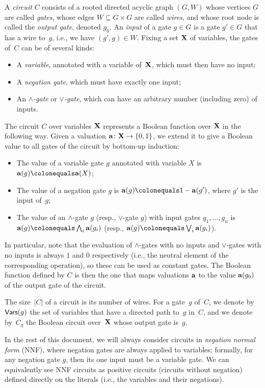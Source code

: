 A \emph{circuit} $C$ consists of a rooted directed acyclic graph $(G, W)$ whose vertices $G$ are called \emph{gates}, whose edges $W \subseteq G \times G$ are called \emph{wires}, and whose root node is called the \emph{output gate}, denoted $g_0$. 
An \emph{input} of a gate $g \in G$ is a gate $g' \in G$ that has a wire to~$g$, i.e., we have $(g', g) \in W$.
Fixing a set $\mathbf{X}$ of variables, the gates of~$C$ can be of several kinds:
\begin{itemize}
\item A \emph{variable}, annotated with a variable of~$\mathbf{X}$, which must then have no input;
\item A \emph{negation gate}, which must have exactly one input;
\item An \emph{$\land$-gate} or \emph{$\lor$-gate}, which can have an arbitrary number (including zero) of inputs.
\end{itemize}
The circuit $C$ over variables $\mathbf{X}$ represents a Boolean function over $\mathbf{X}$ in the following way.
Given a valuation $\mathbf{a}\colon \mathbf{X} \to \{0, 1\}$, we extend it to give a Boolean value to all gates of the circuit by bottom-up induction:
\begin{itemize}
    \item The value of a variable gate $g$ annotated with variable $X$ is $\ba(g) \colonequals \ba(X)$;
    \item The value of a negation gate $g$ is $\ba(g) \colonequals 1 - \ba(g')$, where $g'$ is the input of~$g$;
    \item The value of an $\land$-gate $g$ (resp., $\lor$-gate $g$) with input gates $g_1, \ldots, g_n$ is $\ba(g) \colonequals \bigwedge_i \ba(g_i)$ (resp., $\ba(g) \colonequals \bigvee_i \ba(g_i)$).
\end{itemize}
In particular, note that the evaluation of $\land$-gates with no inputs and $\lor$-gates with no inputs is always $1$ and $0$ respectively (i.e., the neutral element of the corresponding operation), so these can be used as constant gates. The Boolean function defined by $C$ is then the one that maps valuations $\mathbf{a}$ to the value $\mathbf{a}(g_0)$ of the output gate of the circuit.

The size~$|C|$ of a circuit is its number
of wires.  For a gate~$g$ of~$C$, we denote by~$\mathsf{Vars}(g)$ the set of variables
that have a directed path to~$g$ in~$C$, and we denote by~$C_g$ the Boolean
circuit over~$\mathbf{X}$ whose output gate is~$g$. 

In the rest of this document, we will always consider circuits in \emph{negation normal form} (NNF), where negation gates are always applied to variables; formally, for any negation gate $g$, then its one input must be a variable gate. We can equivalently see NNF circuits as positive circuits (circuits without negation) defined directly on the literals (i.e., the variables and their negations).

